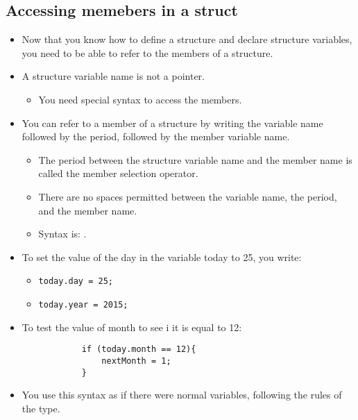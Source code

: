\subsection{Accessing memebers in a struct}
\begin{itemize}
    \item Now that you know how to define a structure and declare structure variables, you need to be able to refer to the members of a structure. 
    \item A structure variable name is not a pointer.
        \begin{itemize}
            \item You need special syntax to access the members.
        \end{itemize}
    
    \item You can refer to a member of a structure by writing the variable name followed by the period, followed by the member variable name.
        \begin{itemize}
            \item The period between the structure variable name and the member name is called the member selection operator. 
            \item There are no spaces permitted between the variable name, the period, and the member name. 
            \item Syntax is: .
        \end{itemize}
    
    \item To set the value of the day in the variable today to 25, you write:
        \begin{itemize}
            \item \texttt{today.day = 25;}
            \item \texttt{today.year = 2015;}
        \end{itemize}
    
    \item To test the value of month to see i it is equal to 12:
        \begin{verbatim}
            if (today.month == 12){
                nextMonth = 1;
            }
        \end{verbatim}
    
    \item You use this syntax as if there were normal variables, following the rules of the type. 
\end{itemize}

